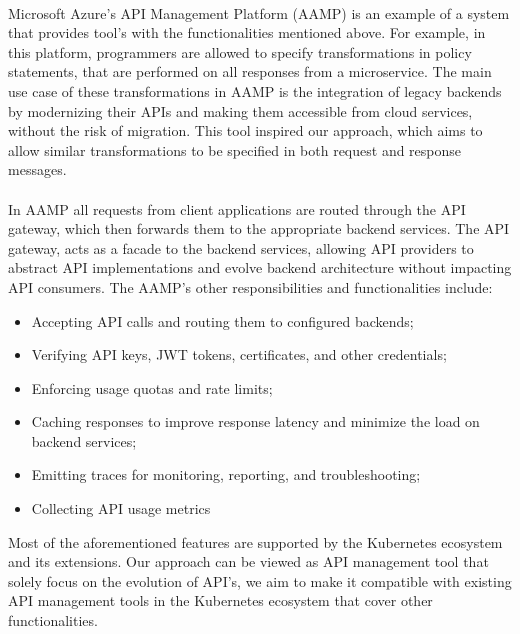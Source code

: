 \paragraph{}

Microsoft Azure's API Management Platform (AAMP) is an example of a system that provides tool's with the functionalities mentioned above.
For example, in this platform, programmers are allowed to specify transformations in policy statements, that are performed on all responses from a microservice.
The main use case of these transformations in AAMP is the integration of legacy backends by modernizing their APIs and making them accessible from cloud services, without the risk of migration.
This tool inspired our approach, which aims to allow similar transformations to be specified in both request and response messages.

\paragraph{}

In AAMP all requests from client applications are routed through the API gateway, which then forwards them to the appropriate backend services.
The API gateway, acts as a facade to the backend services,
allowing API providers to abstract API implementations and evolve backend architecture without impacting API consumers.
The AAMP's other responsibilities and functionalities include:

\begin{itemize}
    \item Accepting API calls and routing them to configured backends;
    \item Verifying API keys, JWT tokens, certificates, and other credentials;
    \item Enforcing usage quotas and rate limits;
    \item Caching responses to improve response latency and minimize the load on backend services;
    \item Emitting traces for monitoring, reporting, and troubleshooting;
    \item Collecting API usage metrics
\end{itemize}

Most of the aforementioned features are supported by the Kubernetes ecosystem and its extensions.
Our approach can be viewed as API management tool that solely focus on the evolution of API's,
we aim to make it compatible with existing API management tools in the Kubernetes ecosystem that cover other functionalities.
